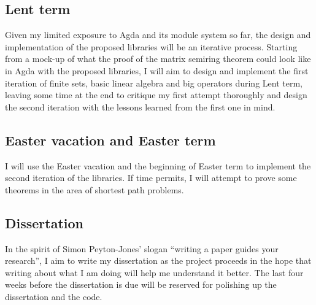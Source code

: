 \documentclass[a4paper]{scrartcl}
\begin{document}
\subsection{Lent term}

Given my limited exposure to Agda and its module system so far, the design and implementation of the proposed libraries will be an iterative process.
Starting from a mock-up of what the proof of the matrix semiring theorem could look like in Agda with the proposed libraries, I will aim to design and implement the first iteration of finite sets, basic linear algebra and big operators during Lent term, leaving some time at the end to critique my first attempt thoroughly and design the second iteration with the lessons learned from the first one in mind.

\subsection{Easter vacation and Easter term}

I will use the Easter vacation and the beginning of Easter term to implement the second iteration of the libraries. If time permits, I will attempt to prove some theorems in the area of shortest path problems.

\subsection{Dissertation}

In the spirit of Simon Peyton-Jones' slogan \enquote{writing a paper guides your research}, I aim to write my dissertation as the project proceeds in the hope that writing about what I am doing will help me understand it better. The last four weeks before the dissertation is due will be reserved for polishing up the dissertation and the code.

\printbibliography
\end{document}
